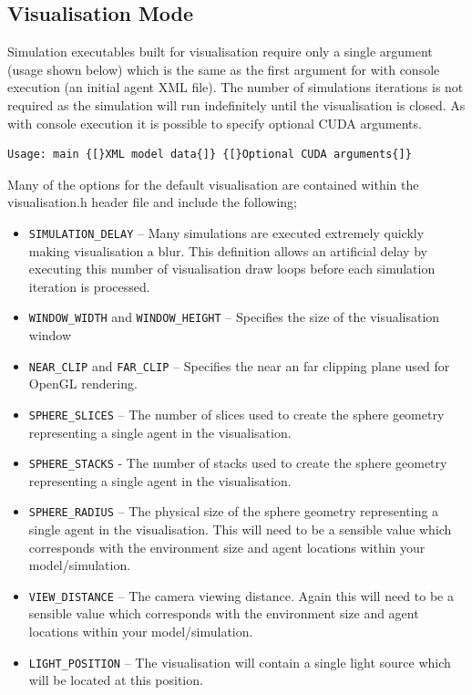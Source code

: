 \documentclass[11pt, a4paper, onecolumn, oneside]{report}
\begin{document}
\subsection{Visualisation Mode}
\label{sec:452}

Simulation executables built for visualisation require only a single argument (usage shown below) which is the same as the first argument for with console execution (an initial agent XML file).
The number of simulations iterations is not required as the simulation will run indefinitely until the visualisation is closed.
As with console execution it is possible to specify optional CUDA arguments.

\begin{verbatim}
Usage: main {[}XML model data{]} {[}Optional CUDA arguments{]}
\end{verbatim}

Many of the options for the default visualisation are contained within the visualisation.h header file and include the following;

\begin{itemize}
    \item \texttt{SIMULATION_DELAY} -- Many simulations are executed extremely quickly making visualisation a blur.
        This definition allows an artificial delay by executing this number of visualisation draw loops before each simulation iteration is processed.
    \item \texttt{WINDOW_WIDTH} and \texttt{WINDOW_HEIGHT} -- Specifies the size of the visualisation window 
    \item \texttt{NEAR_CLIP} and \texttt{FAR_CLIP} -- Specifies the near an far clipping plane used for OpenGL rendering.
    \item \texttt{SPHERE_SLICES} -- The number of slices used to create the sphere geometry representing a single agent in the visualisation.
    \item \texttt{SPHERE_STACKS} - The number of stacks used to create the sphere geometry representing a single agent in the visualisation.
    \item \texttt{SPHERE_RADIUS} -- The physical size of the sphere geometry representing a single agent in the visualisation.
        This will need to be a sensible value which corresponds with the environment size and agent locations within your model/simulation.
    \item \texttt{VIEW_DISTANCE} -- The camera viewing distance.
        Again this will need to be a sensible value which corresponds with the environment size and agent locations within your model/simulation.
    \item \texttt{LIGHT_POSITION} -- The visualisation will contain a single light source which will be located at this position.
\end{itemize}
\end{document}

